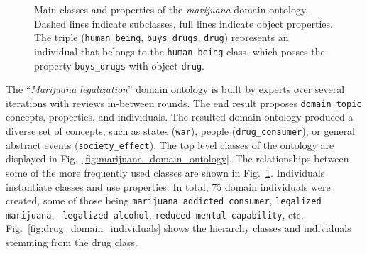 \begin{figure}
	\centering
	\footnotesize
\caption{Main classes and properties of the \textit{marijuana} domain 
ontology. 
Dashed lines indicate subclasses, full lines indicate object properties. 
The triple (\texttt{human\_being}, \texttt{buys\_drugs}, \texttt{drug}) represents an 
individual that belongs to the
\texttt{human\_being} class, which posses the property \texttt{buys\_drugs} with 
object \texttt{drug}.
} 
\label{fig:main-classes}
\end{figure}

The ``\emph{Marijuana legalization}'' domain ontology is built by experts over
several iterations with reviews in-between rounds. The end result proposes 
\texttt{domain\_topic} concepts, properties, and individuals. The resulted
domain ontology produced a diverse set of concepts, such as states (\texttt{war}),
people (\texttt{drug\_consumer}), or general abstract events (\texttt{society\_effect}). 
The top level classes of the ontology are displayed in 
Fig.~\ref{fig:marijuana_domain_ontology}. The relationships between some of the more frequently
used classes are shown in Fig.~\ref{fig:main-classes}. 
Individuals instantiate classes
and use properties. In total, 75 domain individuals were created, some of those
being \texttt{marijuana addicted consumer}, \texttt{legalized marijuana}, \texttt{
legalized alcohol}, \texttt{reduced mental capability}, etc. 
Fig.~\ref{fig:drug_domain_individuals} shows the hierarchy classes and 
individuals stemming from the drug class. 

